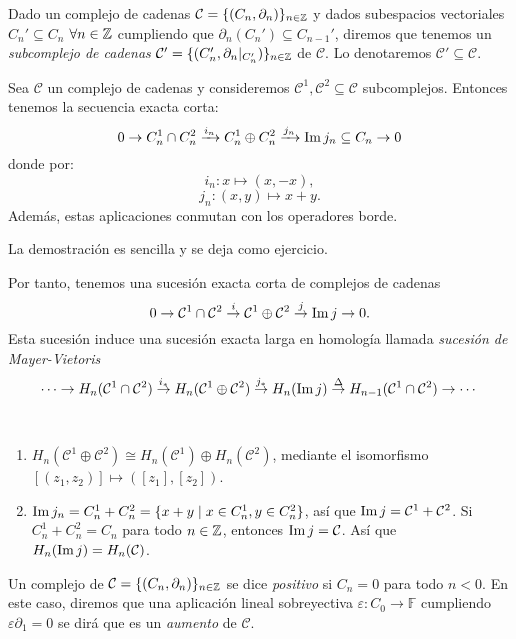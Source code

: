 \documentclass[HS.tex]{subfiles}
\begin{document}
\begin{defi}
Dado un complejo de cadenas $\mathcal{C} = \{(C_n,\partial_n)\}_{n \in \mathbb{Z}}$ y dados subespacios vectoriales $C_n' \subseteq C_n$ $\forall n \in \mathbb{Z}$ cumpliendo que $\partial_n(C_n') \subseteq C_{n-1}'$, diremos que tenemos un \emph{subcomplejo de cadenas} $\mathcal{C}' = \{(C_n',\partial_n|_{C_n'})\}_{n \in \mathbb{Z}}$ de $\mathcal{C}$. Lo denotaremos $\mathcal{C}' \subseteq \mathcal{C}$.
\end{defi}

\begin{prop}
Sea $\mathcal{C}$ un complejo de cadenas y consideremos $\mathcal{C}^1, \mathcal{C}^2 \subseteq \mathcal{C}$ subcomplejos.
Entonces tenemos la secuencia exacta corta:
\[ 0 \to C_n^1 \cap C_n^2 \xrightarrow{i_n} C_n^1 \oplus C_n^2 \xrightarrow{j_n} \operatorname{Im}{j_n}\subseteq C_n \to 0 \]
donde por:
\[ i_n \colon x \mapsto (x,-x), \]
\[ j_n \colon (x,y) \mapsto x+y.\]
Además, estas aplicaciones conmutan con los operadores borde.
\end{prop}
La demostración es sencilla y se deja como ejercicio.

Por tanto, tenemos una sucesión exacta corta de complejos de cadenas
\[
0\to\mathcal{C}^1\cap\mathcal{C}^2\overset{i}{\to}\mathcal{C}^1\oplus\mathcal{C}^2\overset{j}{\to}\operatorname{Im}{j}\to 0.
\]
Esta sucesión induce una sucesión exacta larga en homología llamada \emph{sucesión de Mayer-Vietoris}
\[
\cdots\to H_n(\mathcal{C}^1\cap\mathcal{C}^2)\overset{i_*}{\to}H_n(\mathcal{C}^1\oplus\mathcal{C}^2)\overset{j_*}{\to}H_n(\operatorname{Im}{j})\overset{\Delta}{\to}H_{n-1}(\mathcal{C}^1\cap\mathcal{C}^2)\to\cdots
\]
\newpage
\begin{observaciones}\
\begin{enumerate}
\item $H_n(\mathcal{C}^1\oplus\mathcal{C}^2)\cong H_n(\mathcal{C}^1)\oplus H_n(\mathcal{C}^2)$, mediante el isomorfismo $[(z_1,z_2)]\mapsto ([z_1],[z_2])$.
\item $\operatorname{Im}{j_n}=C^1_n+C^2_n=\{x+y\mid x\in C^1_n, y\in C^2_n\}$, así que $\operatorname{Im}{j}=\mathcal{C}^1+\mathcal{C}^2$. Si $C^1_n+C_n^2=C_n$ para todo $n\in\mathbb{Z}$, entonces $\operatorname{Im}{j}=\mathcal{C}$. Así que $H_n(\operatorname{Im}{j})=H_n(\mathcal{C})$.
\end{enumerate}
\end{observaciones}

\begin{defi}
Un complejo de $\mathcal{C}=\{(C_n,\partial_n)\}_{n\in\mathbb{Z}}$ se dice \emph{positivo} si $C_n=0$ para todo $n<0$. En este caso, diremos que una aplicación lineal sobreyectiva $\varepsilon: C_0\to\mathbb{F}$ cumpliendo $\varepsilon\partial_1=0$ se dirá que es un \emph{aumento} de $\mathcal{C}$.
\end{defi}
\end{document}

